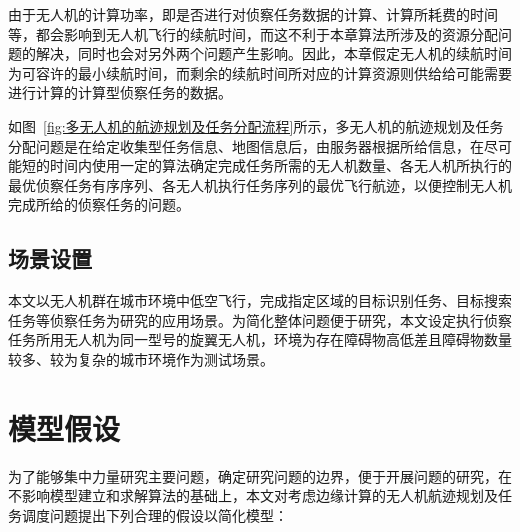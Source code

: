 由于无人机的计算功率，即是否进行对侦察任务数据的计算、计算所耗费的时间等，都会影响到无人机飞行的续航时间，而这不利于本章算法所涉及的资源分配问题的解决，同时也会对另外两个问题产生影响。因此，本章假定无人机的续航时间为可容许的最小续航时间，而剩余的续航时间所对应的计算资源则供给给可能需要进行计算的计算型侦察任务的数据。

如图~\ref{fig:多无人机的航迹规划及任务分配流程}所示，多无人机的航迹规划及任务分配问题是在给定收集型任务信息、地图信息后，由服务器根据所给信息，在尽可能短的时间内使用一定的算法确定完成任务所需的无人机数量、各无人机所执行的最优侦察任务有序序列、各无人机执行任务序列的最优飞行航迹，以便控制无人机完成所给的侦察任务的问题。

\subsection{场景设置}

本文以无人机群在城市环境中低空飞行，完成指定区域的目标识别任务、目标搜索任务等侦察任务为研究的应用场景。为简化整体问题便于研究，本文设定执行侦察任务所用无人机为同一型号的旋翼无人机，环境为存在障碍物高低差且障碍物数量较多、较为复杂的城市环境作为测试场景。

\section{模型假设}

为了能够集中力量研究主要问题，确定研究问题的边界，便于开展问题的研究，在不影响模型建立和求解算法的基础上，本文对考虑边缘计算的无人机航迹规划及任务调度问题提出下列合理的假设以简化模型：

